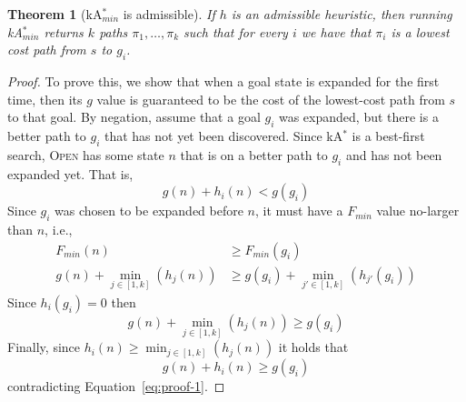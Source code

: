 \documentclass{aicom2e}
\newtheorem{theorem}{Theorem}
\newcommand{\kastar}{kA$^*$}
\newcommand{\kastarmin}{kA$^*_{min}$}
\newcommand{\open}{\textsc{Open}}
\begin{document}

\begin{theorem}[\kastarmin{} is admissible]
If $h$ is an admissible heuristic, then running \kastarmin{} returns $k$ paths
$\pi_1,\ldots, \pi_k$ such that for every $i$ we have that $\pi_i$ is a lowest cost
path from $s$ to $g_i$. \label{the:min-f}
\end{theorem}
 \begin{proof}
To prove this, we show that when a goal state is expanded for the first time,
then its $g$ value is guaranteed to be the cost of the lowest-cost path from
$s$ to that goal. By negation, assume that a goal $g_i$ was expanded, but there
is a better path to $g_i$ that has not yet been discovered. Since \kastar{} is
a best-first search, \open{} has some state $n$ that is on a better path to
$g_i$ and has not been expanded yet. That is,
\begin{equation}
g(n)+h_i(n)<g(g_i)
\label{eq:proof-1}
\end{equation}
Since $g_i$ was chosen to be expanded before $n$, it must have a $F_{min}$ value no-larger than $n$, i.e.,
\begin{align}
F_{min}(n) &\geq  F_{min}(g_i) \\
g(n)+\min_{j\in [1,k]}(h_j(n))& \geq  g(g_i)+\min_{j'\in [1,k]}(h_{j'}(g_i))
\end{align}
Since $h_i(g_i)=0$ then
\[ g(n)+\min_{j\in [1,k]}(h_j(n)) \geq  g(g_i) \]
Finally, since $h_i(n)\geq \min_{j\in [1,k]}(h_j(n))$ it holds that
\[ g(n)+h_i(n) \geq  g(g_i) \]
contradicting Equation~\ref{eq:proof-1}.
\end{proof}


\end{document}
